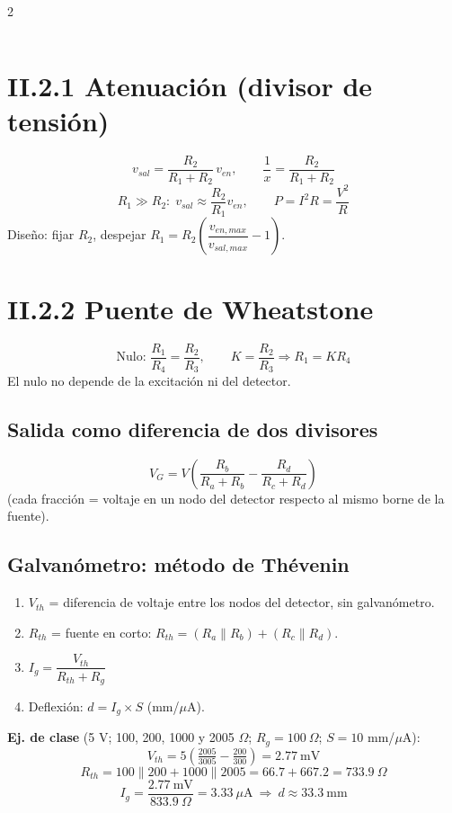\documentclass{article}
\begin{document}
\begin{multicols}{2}
\begin{center}
\begin{tabular}{lcc}
\end{tabular}
\end{center}
\section{II.2.1 Atenuación (divisor de tensión)}
\[
v_{sal} = \frac{R_2}{R_1 + R_2}\,v_{en},\qquad \frac{1}{x} = \frac{R_2}{R_1+R_2}
\]
\[
R_1 \gg R_2:\; v_{sal} \approx \frac{R_2}{R_1}v_{en},\qquad P = I^2R = \frac{V^2}{R}
\]
Diseño: fijar $R_2$, despejar $R_1 = R_2\left(\dfrac{v_{en,max}}{v_{sal,max}} - 1\right)$.\\

\section{II.2.2 Puente de Wheatstone}
\[
\text{Nulo: } \frac{R_1}{R_4} = \frac{R_2}{R_3},\qquad K = \frac{R_2}{R_3} \Rightarrow R_1 = K R_4
\]
El nulo no depende de la excitación ni del detector.

\subsection{Salida como diferencia de dos divisores}
\[
V_G = V\left(\frac{R_b}{R_a + R_b} - \frac{R_d}{R_c + R_d}\right)
\]
(cada fracción = voltaje en un nodo del detector respecto al mismo borne de la fuente).

\subsection{Galvanómetro: método de Thévenin}
\begin{enumerate}
\item $V_{th}$ = diferencia de voltaje entre los nodos del detector, sin galvanómetro.
\item $R_{th}$ = fuente en corto: $R_{th} = (R_a\|R_b) + (R_c\|R_d)$.
\item $I_g = \dfrac{V_{th}}{R_{th} + R_g}$
\item Deflexión: $d = I_g \times S$ (mm/$\mu$A).
\end{enumerate}
\textbf{Ej. de clase} (5 V; 100, 200, 1000 y 2005 $\Omega$; $R_g = 100\ \Omega$; $S = 10$ mm/$\mu$A):
\[
V_{th} = 5\left(\tfrac{2005}{3005} - \tfrac{200}{300}\right) = 2.77\ \text{mV}
\]
\[
R_{th} = 100\|200 + 1000\|2005 = 66.7 + 667.2 = 733.9\ \Omega
\]
\[
I_g = \frac{2.77\ \text{mV}}{833.9\ \Omega} = 3.33\ \mu\text{A}\ \Rightarrow\ d \approx 33.3\ \text{mm}
\]


\end{multicols}
\end{document}
